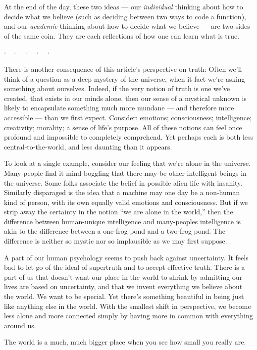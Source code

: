 \documentclass[11pt, oneside]{article}
\theoremstyle{argtstyle}
\newcommand{\dotq}{\cdot\quad}
\newcommand{\scenebreak}{
    \medskip\centerline{$\dotq\dotq\dotq\dotq\cdot$}\medskip
}
\begin{document}
At the end of the day, these two ideas --- our {\em individual}
thinking about how to
decide what we believe (such as deciding between two ways to code a function),
and our {\em academic} thinking about how to decide what we believe --- are two
sides of the same coin. They are each reflections of how one can learn what is
true.

\scenebreak

There is another consequence of this article's perspective on truth:
Often we'll think of a question as a deep mystery of the
universe, when it fact we're asking something about ourselves.
Indeed, if the very notion of truth is one we've created, that exists in our
minds alone, then our sense of a mystical unknown is likely to encapsulate
something much more mundane --- and therefore more accessible --- than we first
expect.
Consider:
emotions; consciousness; intelligence; creativity; morality; a sense of life's
purpose. All of these notions can feel once profound and impossible to
completely comprehend. Yet perhaps each is both less central-to-the-world, and
less daunting than it appears.

To look at a single example, consider our feeling that we're alone in the
universe.
Many people find it mind-boggling
that there may be other intelligent beings in the
universe.
Some folks associate the belief in possible alien life with insanity.
Similarly disparaged is
the idea that a machine may one day be a non-human kind of
person, with its own equally valid emotions and consciousness.
But if we strip away the certainty in the notion ``we are alone
in the world,'' then the difference between human-unique intelligence and
many-peoples intelligence is akin to the difference between a one-frog pond
and a two-frog pond.
The difference is neither so mystic nor so implausible as we may first suppose.

A part of our human psychology seems to push back against uncertainty. It
feels bad to let go of the ideal of supertruth and to accept effective
truth. There is a part of us that doesn't want our place in the world to
shrink by admitting our lives are based on uncertainty, and that we invent
everything we believe about the world.
We want to be special. Yet there's something beautiful in being just
like anything else in the world. With the smallest shift in perspective,
we become
less alone and more connected simply by having more in common with everything
around us.

The world is a much, much bigger place when you see how small you really are.
\end{document}
